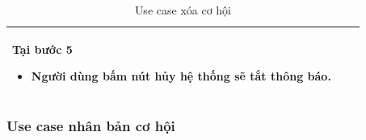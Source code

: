 \documentclass[12pt,a4paper]{article}
\begin{document}
\begin{table}[H]
\begin{tabular}{|p{3.5cm}|p{11.5cm}|c|}
            Tại bước 5\newline
            \vspace{-.8cm}\begin{itemize}
                              \item Người dùng bấm nút hủy hệ thống sẽ tắt thông báo.
            \end{itemize} \\
            \hline
        \end{tabular}
        \caption{Use case xóa cơ hội}

    \end{table}

    \subsubsection*{Use case nhân bản cơ hội }
\end{document}
